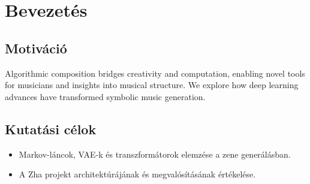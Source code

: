 \chapter{Bevezetés}
\section{Motiváció}
Algorithmic composition bridges creativity and computation, enabling novel tools for musicians and insights into musical structure. We explore how deep learning advances have transformed symbolic music generation.

\section{Kutatási célok}
\begin{itemize}
    \item Markov-láncok, VAE-k és transzformátorok elemzése a zene generálásban.
    \item A Zha projekt architektúrájának és megvalósításának értékelése.
\end{itemize}